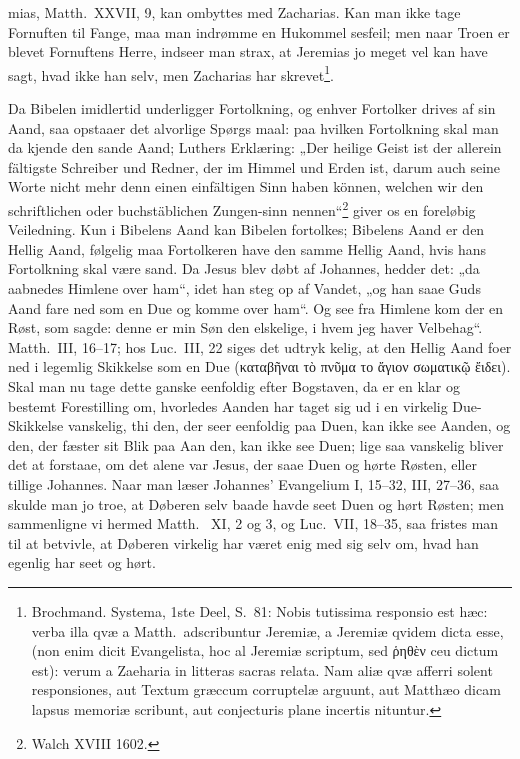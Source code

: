 \documentclass[12pt,a4paper]{article}
\newcommand{\opage}[1]{\marginnote{\footnotesize\textit{[#1]}}}
\begin{document}
mias, Matth.\ XXVII, 9, kan ombyttes med Zacharias. Kan man
ikke tage Fornuften til Fange, maa man indrømme en Hukommel\-%
sesfeil; men naar Troen er blevet Fornuftens Herre, indseer man
strax, at Jeremias jo meget vel kan have sagt, hvad ikke han selv,
men Zacharias har skrevet\footnote{Brochmand. Systema, 1ste Deel,
S.\ 81: Nobis tutissima responsio est hæc: verba illa qvæ a Matth.\
adscribuntur Jeremiæ, a Jeremiæ qvidem dicta esse, (non enim dicit
Evangelista, hoc al Jeremiæ scriptum, sed
ῥηθὲν ceu dictum est): verum a
Zaeharia in litteras sacras relata. Nam aliæ qvæ afferri solent
responsiones, aut Textum græccum corruptelæ arguunt, aut Matthæo
dicam lapsus memoriæ scribunt, aut conjecturis plane incertis
nituntur.}. %

Da Bibelen imidlertid underligger Fortolkning, og enhver
Fortolker drives af sin Aand, saa opstaaer det alvorlige Spørgs\-%
\opage{20}maal: paa hvilken Fortolkning skal man da kjende den sande
Aand; Luthers Erklæring: „Der heilige Geist ist der allerein\-%
fältigste Schreiber und Redner, der im Himmel und Erden ist,
darum auch seine Worte nicht mehr denn einen einfältigen Sinn
haben können, welchen wir den schriftlichen oder buchstäblichen
Zungen-sinn nennen“\footnote{Walch XVIII 1602.} %
giver os en foreløbig Veiledning. Kun i
Bibelens Aand kan Bibelen fortolkes; Bibelens Aand er den Hellig
Aand, følgelig maa Fortolkeren have den samme Hellig Aand,
hvis hans Fortolkning skal være sand. Da Jesus blev døbt af
Johannes, hedder det: „da aabnedes Himlene over ham“, idet han
steg op af Vandet, „og han saae Guds Aand fare ned som en Due
og komme over ham“. Og see fra Himlene kom der en Røst,
som sagde: denne er min Søn den elskelige, i hvem jeg haver
Velbehag“. Matth.\ III, 16--17; hos Luc.\ III, 22 siges det udtryk\-%
kelig, at den Hellig Aand foer ned i legemlig Skikkelse som en
Due (καταβῆναι τὸ πνῦμα το ἄγιον σωματικῷ ἔιδει). Skal man
nu tage dette ganske eenfoldig efter Bogstaven, da er en klar og
bestemt Forestilling om, hvorledes Aanden har taget sig ud i en
virkelig Due-Skikkelse vanskelig, thi den, der seer eenfoldig paa
Duen, kan ikke see Aanden, og den, der fæster sit Blik paa Aan\-%
den, kan ikke see Duen; lige saa vanskelig bliver det at forstaae,
om det alene var Jesus, der saae Duen og hørte Røsten, eller
tillige Johannes. Naar man læser Johannes' Evangelium I, 15--32,
III, 27--36, saa skulde man jo troe, at Døberen selv baade havde
seet Duen og hørt Røsten; men sammenligne vi hermed Matth.\ %
XI, 2 og 3, og Luc.\ VII, 18--35, saa fristes man til at betvivle,
at Døberen virkelig har været enig med sig selv om, hvad han
egenlig har seet og hørt.
\end{document}
